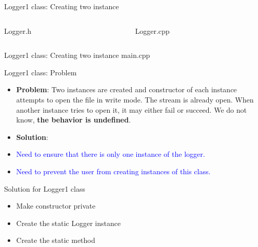 \documentclass[13pt]{beamer}
\begin{document}
\begin{frame}{Logger1 class: Creating two instance}
\begin{columns}[T]
\begin{column}{.48\textwidth}
\lstset{basicstyle=\tiny,style=myCustomCppStyle}
Logger.h

\end{column}

\begin{column}{.48\textwidth}
\lstset{basicstyle=\tiny,style=myCustomCppStyle}
Logger.cpp

\end{column}
\end{columns}
\end{frame}

\begin{frame}{Logger1 class: Creating two instance}
main.cpp
\lstset{basicstyle=\tiny,style=myCustomCppStyle}

\end{frame}

\begin{frame}{Logger1 class: Problem}
\begin{itemize}
\setlength\itemsep{1em}

\item \textbf{Problem}: Two instances are created and constructor of each instance attempts to open the file in write mode. The stream is already open. When another instance tries to open it, it may either fail or succeed. We do not know, \textbf{the behavior is undefined}.

\item \textbf{Solution}:

\item \textcolor{blue}{Need to ensure that there is only one instance of the logger.}

\item \textcolor{blue}{Need to prevent the user from creating instances of this class.}
\end{itemize}
\end{frame}

\begin{frame}{Solution for Logger1 class}
\begin{itemize}
\setlength\itemsep{2em}
\item Make constructor private

\item Create the static Logger instance

\item Create the static method
\end{itemize}
\end{frame}
\end{document}
